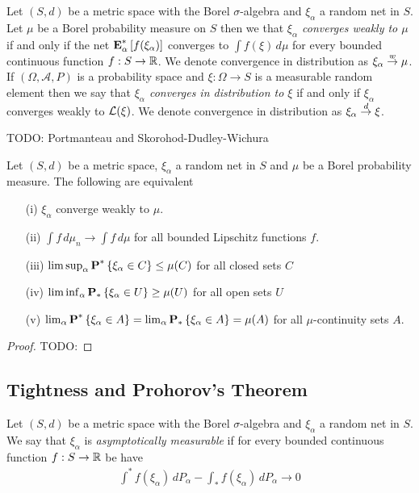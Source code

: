 \begin{defn}Let $(S,d)$ be a metric space with the Borel $\sigma$-algebra and $\xi_\alpha$ a random net in $S$.  Let $\mu$ be a Borel probability measure on $S$ then we that \emph{$\xi_\alpha$ converges weakly to $\mu$}
if and only if the net $\textbf{E}^*_{\alpha}\left [f(\xi_\alpha) \right]$ converges to $\int f(\xi) \, d\mu$ for every bounded continuous function $f : S \to \mathbb{R}$.  We denote convergence in distribution as $\xi_\alpha \overset{w}\to \mu$.  If $(\Omega, \mathcal{A}, P)$ is a probability space and $\xi : \Omega \to S$ is a measurable random element then we say that \emph{$\xi_\alpha$ converges in distribution to $\xi$} if and only if $\xi_\alpha$ converges weakly to $\mathcal{L}(\xi)$.  We denote convergence in distribution as $\xi_\alpha \overset{d}\to \xi$.
\end{defn}

TODO: Portmanteau and Skorohod-Dudley-Wichura

\begin{thm}\label{PortmanteauTheoremHoffmanJorgensen}Let $(S,d)$ be a metric space, $\xi_\alpha$ a random net in $S$ and $\mu$ be a
 Borel probability measure.  The following are equivalent
\begin{itemize}
\item[(i)] $\xi_\alpha$ converge weakly to $\mu$.
\item[(ii)] $\int f \, d\mu_n \to \int f \, d\mu$
  for all bounded Lipschitz functions $f$.
\item[(iii)] $\limsup_{\alpha} \textbf{P}^* \left \{\xi_\alpha \in C \right \} \leq
  \mu(C)$ for all closed sets $C$
\item[(iv)] $\liminf_{\alpha} \textbf{P}_* \left \{\xi_\alpha \in U \right \} \geq
  \mu(U)$ for all open sets $U$
\item[(v)] $\lim_{\alpha} \textbf{P}^* \left \{\xi_\alpha \in A \right \} = \lim_{\alpha} \textbf{P}_* \left \{\xi_\alpha \in A \right \} = \mu(A)$ for all
  $\mu$-continuity sets $A$.
\end{itemize}
\end{thm}
\begin{proof}
TODO:
\end{proof}

\subsection{Tightness and Prohorov's Theorem}

\begin{defn}\label{defn:AsymptoticMeasurability}Let $(S,d)$ be a metric space with the Borel $\sigma$-algebra and $\xi_\alpha$ a random net in $S$.  We say that $\xi_\alpha$ is \emph{asymptotically measurable} if for every bounded continuous function $f : S \to \mathbb{R}$ be have
\begin{align*}
\int^* f(\xi_\alpha) \, dP_\alpha - \int_* f(\xi_\alpha)  \, dP_\alpha \to 0
\end{align*}
\end{defn}

